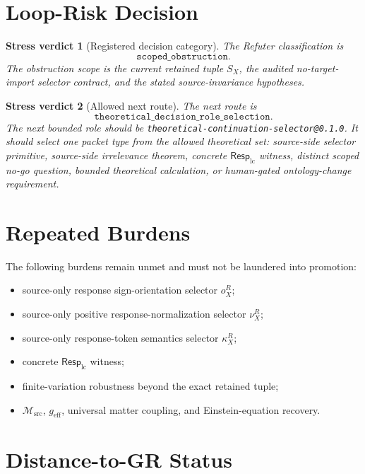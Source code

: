 \documentclass[11pt]{article}
\newcommand{\Msrc}{\mathcal{M}_{\mathrm{src}}}
\newcommand{\RespLC}{\mathsf{Resp}_{\mathrm{lc}}}
\newcommand{\geff}{g_{\mathrm{eff}}}
\newtheorem{verdict}{Stress verdict}
\begin{document}
\section{Loop-Risk Decision}

\begin{verdict}[Registered decision category]
The Refuter classification is
\[
    \texttt{scoped\_obstruction}.
\]
The obstruction scope is the current retained tuple \(S_X\), the
audited no-target-import selector contract, and the stated
source-invariance hypotheses.
\end{verdict}

\begin{verdict}[Allowed next route]
The next route is
\[
    \texttt{theoretical\_decision\_role\_selection}.
\]
The next bounded role should be
\texttt{theoretical-continuation-selector@0.1.0}. It should select
one packet type from the allowed theoretical set: source-side selector
primitive, source-side irrelevance theorem, concrete \(\RespLC\)
witness, distinct scoped no-go question, bounded theoretical
calculation, or human-gated ontology-change requirement.
\end{verdict}

\section{Repeated Burdens}

The following burdens remain unmet and must not be laundered into
promotion:
\begin{itemize}
    \item source-only response sign-orientation selector \(o^R_X\);
    \item source-only positive response-normalization selector
    \(\nu^R_X\);
    \item source-only response-token semantics selector \(\kappa^R_X\);
    \item concrete \(\RespLC\) witness;
    \item finite-variation robustness beyond the exact retained tuple;
    \item \(\Msrc\), \(\geff\), universal matter coupling, and
    Einstein-equation recovery.
\end{itemize}

\section{Distance-to-GR Status}
\end{document}

